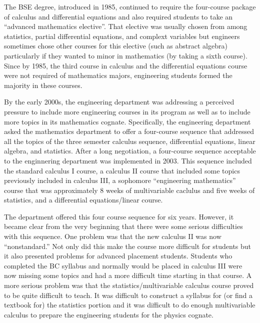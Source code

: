 \documentclass[
]{book}
\begin{document}
The BSE degree, introduced in 1985, continued to require the four-course package of calculus and differential equations and also required students to take an ``advanced mathematics elective''. That elective was usually chosen from among statistics, partial differential equations, and complext variables but engineers sometimes chose other courses for this elective (such as abstract algebra) particularly if they wanted to minor in mathematics (by taking a sixth course). Since by 1985, the third course in calculus and the differential equations course were not required of mathematics majors, engineering students formed the majority in these courses.

By the early 2000s, the engineering department was addressing a perceived pressure to include more engineering courses in its program as well as to include more topics in its mathematics cognate. Specifically, the engineering department asked the mathematics department to offer a four-course sequence that addressed all the topics of the three semester calculus sequence, differential equations, linear algebra, and statistics. After a long negotiation, a four-course sequence acceptable to the enginnering department was implemented in 2003. This sequence included the standard calculus I course, a calculus II course that included some topics previously included in calculus III, a sophomore ``engineering mathematics'' course that was approximately 8 weeks of multivariable caclulus and five weeks of statistics, and a differential equations/linear course.

The department offered this four course sequence for six years. However, it became clear from the very beginning that there were some serious difficulties with this sequence. One problem was that the new calculus II was now ``nonstandard.'' Not only did this make the course more difficult for students but it also presented problems for advanced placement students. Students who completed the BC syllabus and normally would be placed in calculus III were now missing some topics and had a more difficult time starting in that course. A more serious problem was that the statistics/multivariable calculus course proved to be quite difficult to teach. It was difficult to construct a syllabus for (or find a textbook for) the statistics portion and it was difficult to do enough multivariable calculus to prepare the engineering students for the physics cognate.
\end{document}
